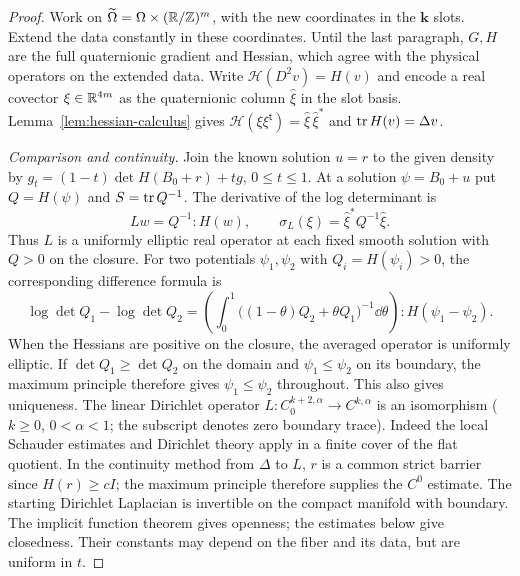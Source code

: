 \begin{proof}
Work on $\widetilde\Omega=\Omega\times(\mathbb R/\mathbb Z)^m$, with the new
coordinates in the $\mathbf k$ slots. Extend the data constantly in these
coordinates. Until the last paragraph, $G,H$ are the full quaternionic
gradient and Hessian, which agree with the physical operators on the
extended data. Write $\mathcal H(D^2v)=H(v)$ and encode a real covector
$\xi\in\mathbb R^{4m}$ as the quaternionic column $\widehat\xi$ in the slot
basis. Lemma~\ref{lem:hessian-calculus} gives
$\mathcal H(\xi\xi^{\mathsf t})=\widehat\xi\,\widehat\xi^*$ and
$\operatorname{tr} H(v)=\Delta v$.

\emph{Comparison and continuity.}
Join the known solution $u=r$ to the given density by
$g_t=(1-t)\det H(B_0+r)+tg$, $0\le t\le1$.
At a solution $\psi=B_0+u$ put $Q=H(\psi)$ and $S=\operatorname{tr} Q^{-1}$.
The derivative of the log determinant is
\[
 Lw=Q^{-1}:H(w),\qquad
 \sigma_L(\xi)=\widehat\xi^*Q^{-1}\widehat\xi .
\]
Thus $L$ is a uniformly elliptic real operator at each fixed smooth
solution with $Q>0$ on the closure. For two potentials $\psi_1,\psi_2$
with $Q_i=H(\psi_i)>0$, the corresponding difference formula is
\[
 \log\det Q_1-\log\det Q_2
   =\left(\int_0^1\big((1-\theta)Q_2+\theta Q_1\big)^{-1}\dd\theta\right)
          :H(\psi_1-\psi_2).
\]
When the Hessians are positive on the closure, the averaged operator
is uniformly elliptic. If $\det Q_1\ge\det Q_2$ on the domain and
$\psi_1\le\psi_2$ on its boundary, the maximum principle therefore
gives $\psi_1\le\psi_2$ throughout. This also gives uniqueness.
The linear Dirichlet
operator $L:C^{k+2,\alpha}_0\to C^{k,\alpha}$ is an isomorphism
($k\ge0$, $0<\alpha<1$; the subscript denotes zero boundary trace).
Indeed the local Schauder estimates and Dirichlet theory
\cite[Theorems~6.14 and~6.19]{GilbargTrudinger} apply in a finite
cover of the flat quotient. In the continuity method from $\Delta$ to
$L$, $r$ is a common strict barrier since $H(r)\ge cI$; the maximum
principle therefore supplies the $C^0$ estimate. The starting Dirichlet
Laplacian is invertible on the compact manifold with boundary.
The implicit function theorem gives openness; the estimates below give
closedness. Their constants may depend on the fiber and its data, but
are uniform in $t$.


\end{proof}
